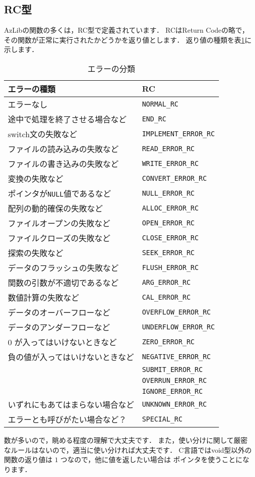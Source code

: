 \subsection{RC型} \label{subsec:RC-type}
AzLibの関数の多くは，RC型で定義されています．
RCはReturn Codeの略で，その関数が正常に実行されたかどうかを返り値とします．
返り値の種類を表\ref{tb:rc_pattern}に示します．
\begin{table}
\caption{エラーの分類} \label{tb:rc_pattern}
\centering
\begin{tabular}{ll}
\toprule
エラーの種類 & RC \\
\midrule
エラーなし & \texttt{NORMAL\_RC} \\
途中で処理を終了させる場合など & \texttt{END\_RC} \\
switch文の失敗など & \texttt{IMPLEMENT\_ERROR\_RC} \\
ファイルの読み込みの失敗など & \texttt{READ\_ERROR\_RC} \\
ファイルの書き込みの失敗など & \texttt{WRITE\_ERROR\_RC} \\
変換の失敗など & \texttt{CONVERT\_ERROR\_RC} \\
ポインタが\texttt{NULL}値であるなど & \texttt{NULL\_ERROR\_RC} \\
配列の動的確保の失敗など & \texttt{ALLOC\_ERROR\_RC} \\
ファイルオープンの失敗など & \texttt{OPEN\_ERROR\_RC} \\
ファイルクローズの失敗など & \texttt{CLOSE\_ERROR\_RC} \\
探索の失敗など & \texttt{SEEK\_ERROR\_RC} \\
データのフラッシュの失敗など & \texttt{FLUSH\_ERROR\_RC} \\
関数の引数が不適切であるなど & \texttt{ARG\_ERROR\_RC} \\
数値計算の失敗など & \texttt{CAL\_ERROR\_RC} \\
データのオーバーフローなど & \texttt{OVERFLOW\_ERROR\_RC} \\
データのアンダーフローなど & \texttt{UNDERFLOW\_ERROR\_RC} \\
$0$ が入ってはいけないときなど & \texttt{ZERO\_ERROR\_RC} \\
負の値が入ってはいけないときなど & \texttt{NEGATIVE\_ERROR\_RC} \\
 & \texttt{SUBMIT\_ERROR\_RC} \\
 & \texttt{OVERRUN\_ERROR\_RC} \\
 & \texttt{IGNORE\_ERROR\_RC} \\
いずれにもあてはまらない場合など & \texttt{UNKNOWN\_ERROR\_RC} \\
エラーとも呼びがたい場合など？ & \texttt{SPECIAL\_RC} \\
\bottomrule
\end{tabular}
\end{table}
数が多いので，眺める程度の理解で大丈夫です．
また，使い分けに関して厳密なルールはないので，適当に使い分ければ大丈夫です．
C言語ではvoid型以外の関数の返り値は $1$ つなので，他に値を返したい場合は
ポインタを使うことになります．

